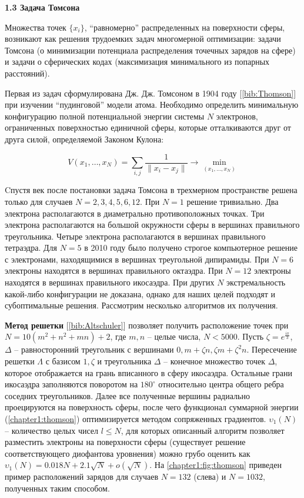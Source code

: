 \vspace{5pt}
\textbf{1.3 Задача Томсона}\label{chapters:1.3}
\vspace{5pt}

Множества точек $\{ x_i \}$, \enquote{равномерно} распределенных на поверхности сферы, возникают как решения трудоемких задач многомерной оптимизации: задачи Томсона (о минимизации потенциала распределения точечных зарядов на сфере) и задачи о сферических кодах (максимизация минимального из попарных расстояний). 

Первая из задач сформулирована Дж. Дж. Томсоном в 1904 году [\ref{bib:Thomson}] при изучении \enquote{пудинговой} модели атома. 
Необходимо определить минимальную конфигурацию полной потенциальной энергии системы $N$ электронов, ограниченных поверхностью единичной сферы, которые отталкиваются друг от друга силой, определяемой Законом Кулона:

\begin{equation}\label{chapter1:thomson}
V(x_1, \dots, x_N) = \sum\limits_{i,j} \frac{1}{ \|x_i-x_j\| } \to \min\limits_{(x_1, \dots, x_N)}
\end{equation}

Cпустя век после постановки задача Томсона в трехмерном пространстве решена только для случаев 
$N = 2, 3, 4, 5, 6, 12$. 
При $N = 1$ решение тривиально. 
Два электрона располагаются в диаметрально противоположных точках.
Три электрона располагаются на большой окружности сферы в вершинах правильного треугольника.
Четыре электрона располагаются в вершинах правильного тетраэдра.
Для $N = 5$ в 2010 году было получено строгое компьютерное решение с электронами, находящимися в вершинах треугольной дипирамиды.
При $N = 6$ электроны находятся в вершинах правильного октаэдра.
При $N = 12$ электроны находятся в вершинах правильного икосаэдра.
При других $N$ экстремальность какой-либо конфигурации не доказана, 
однако для наших целей подходят и субоптимальные решения. Рассмотрим несколько алгоритмов их получения.

\textbf{Метод решетки} [\ref{bib:Altschuler}] позволяет получить расположение точек при $N = 10(m^2 + n^2 + mn) + 2$, 
где $m,n$ -- целые числа, $N < 5000$. 
Пусть $\zeta = e^{\frac{i\pi}{3}}$, 
$\Delta$ -- равносторонний треугольник с вершинами $0, m + \zeta n, \zeta m + \zeta^2 n$. 
Пересечение решетки $\Lambda$ с базисом $1, \zeta$ 
и треугольника $\Delta$ -- конечное множество точек $\Delta$, которое отображается на грань вписанного в сферу икосаэдра. 
Остальные грани икосаэдра заполняются поворотом на $180^{\circ}$ относительно центра общего ребра соседних треугольников. 
Далее все полученные вершины радиально проецируются на поверхность сферы, после чего функционал суммарной энергии 
(\ref{chapter1:thomson}) оптимизируется методом сопряженных градиентов. 
$\upsilon_1(N)$ -- количество целых чисел $l \le N$, для которых описанный алгоритм позволяет разместить электроны 
на поверхности сферы (существует решение соответствующего диофантова уровнения) можно грубо оценить как
$\upsilon_1(N) = 0.018N + 2.1\sqrt{N} + o(\sqrt{N})$.
На \figurename{ \ref{chapter1:fig:thomson}} приведен пример расположений зарядов для случаев $N=132$ (слева) и $N=1032$, полученных таким способом.

